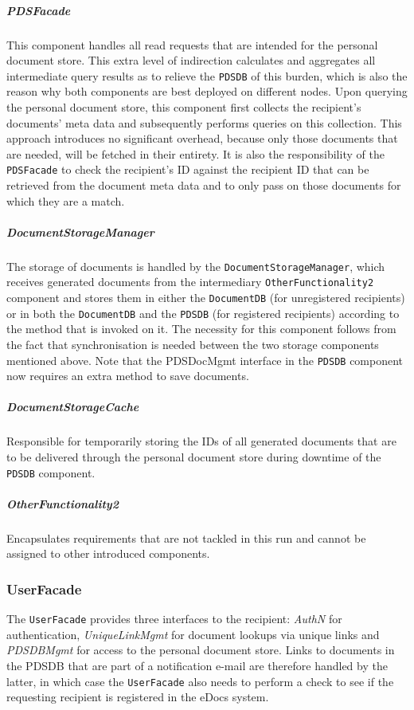 \documentclass[a4paper,10pt]{article}
\begin{document}
\subparagraph{PDSFacade}
This component handles all read requests that are intended for the personal document store. This extra level of indirection calculates and aggregates all intermediate query results as to relieve the \texttt{PDSDB} of this burden, which is also the reason why both components are best deployed on different nodes. Upon querying the personal document store, this component first collects the recipient's documents' meta data and subsequently performs queries on this collection. This approach introduces no significant overhead, because only those documents that are needed, will be fetched in their entirety. It is also the responsibility of the \texttt{PDSFacade} to check the recipient's ID against the recipient ID that can be retrieved from the document meta data and to only pass on those documents for which they are a match.

\subparagraph{DocumentStorageManager}
The storage of documents is handled by the \texttt{DocumentStorageManager}, which receives generated documents from the intermediary \texttt{OtherFunctionality2} component and stores them in either the \texttt{DocumentDB} (for unregistered recipients) or in both the \texttt{DocumentDB} and the \texttt{PDSDB} (for registered recipients) according to the method that is invoked on it. The necessity for this component follows from the fact that synchronisation is needed between the two storage components mentioned above. Note that the PDSDocMgmt interface in the \texttt{PDSDB} component now requires an extra method to save documents.

\subparagraph{DocumentStorageCache}
Responsible for temporarily storing the IDs of all generated documents that are to be delivered through the personal document store during downtime of the \texttt{PDSDB} component.

\subparagraph{OtherFunctionality2}
Encapsulates requirements that are not tackled in this run and cannot be assigned to other introduced components.





\subsubsection*{UserFacade}
The \texttt{UserFacade} provides three interfaces to the recipient: \textit{AuthN} for authentication, \textit{UniqueLinkMgmt} for document lookups via unique links and \textit{PDSDBMgmt} for access to the personal document store. Links to documents in the PDSDB that are part of a notification e-mail are therefore handled by the latter, in which case the \texttt{UserFacade} also needs to perform a check to see if the requesting recipient is registered in the eDocs system.
\end{document}
